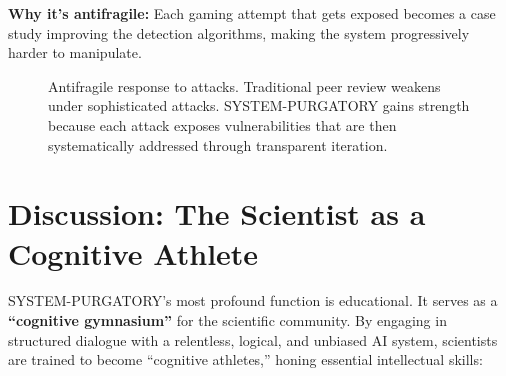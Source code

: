 \documentclass[11pt,a4paper]{article}
\begin{document}
\textbf{Why it's antifragile:} Each gaming attempt that gets exposed becomes a case study improving the detection algorithms, making the system progressively harder to manipulate.

\begin{figure}[h!]
\centering
{}
\caption{Antifragile response to attacks. Traditional peer review weakens under sophisticated attacks. SYSTEM-PURGATORY gains strength because each attack exposes vulnerabilities that are then systematically addressed through transparent iteration.}
\label{fig:antifragile_science}
\end{figure}

\section{Discussion: The Scientist as a Cognitive Athlete}
SYSTEM-PURGATORY's most profound function is educational. It serves as a \textbf{``cognitive gymnasium''} for the scientific community. By engaging in structured dialogue with a relentless, logical, and unbiased AI system, scientists are trained to become ``cognitive athletes,'' honing essential intellectual skills:
\end{document}
